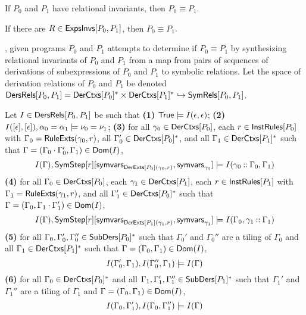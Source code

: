 \begin{ex}
  \label{ex:rel-invs}
\end{ex}

If $P_0$ and $P_1$ have relational invariants, then $P_0 \equiv P_1$.
%
\begin{lemma}
  \label{lemma:equiv-evidence}
  If there are $R \in \mathsf{ExpsInvs}[ P_0, P_1 ]$, then $P_0 \equiv P_1$.
\end{lemma}

\sys, given programs $P_0$ and $P_1$ attempts to determine if $P_0
\equiv P_1$ by synthesizing relational invariants of $P_0$ and $P_1$
from a map from pairs of sequences of derivations of subexpressions of
$P_0$ and $P_1$ to symbolic relations.
%
Let the space of derivation relations of $P_0$ and $P_1$ be denoted
$\mathsf{DersRels}[  P_0 ,  P_1  ] = \mathsf{DerCtxs}[ P_0 ]^{*} \times
\mathsf{DerCtxs}[ P_1 ]^{*} \hookrightarrow \mathsf{SymRels}[ P_0, P_1 ]$.
%
\begin{defn}
  \label{defn:der-invs}
  Let $I \in \mathsf{DersRels}[  P_0 ,  P_1  ] $ be such that
  \textbf{(1)} $\mathsf{True} \models I(\epsilon, \epsilon)$;
  \textbf{(2)} $I([ \epsilon ], [ \epsilon ]), \alpha_0 = \alpha_1
  \models \nu_0 = \nu_1$;
  \textbf{(3)} for all $\gamma_0 \in \mathsf{DerCtxs}[  P_0  ]$, %
  each $r \in \mathsf{InstRules}[  P_0  ]$ with $\Gamma_0 = \mathsf{RuleExts}( \gamma_0,
  r) $, %
  all $\Gamma_0' \in \mathsf{DerCtxs}[  P_0  ]^{*}$, and %
  all $\Gamma_1 \in \mathsf{DerCtxs}[ P_1 ]^{*}$ such that $\Gamma = (\Gamma_0
  \cdot \Gamma_0', \Gamma_1) \in \mathsf{Dom}(I)$,
  \[ I(\Gamma), %
  \subs{ \symstep{ r } }{ %
    \symvars{ \derexts{ P_0 }(\gamma_0, r) }, \symvars{ \gamma_0 } }  %
  \entails I( \gamma_0 \cons \Gamma_0, \Gamma_1) \]
  \textbf{(4)} for all $\Gamma_0 \in \mathsf{DerCtxs}[  P_0  ]$, %
  each $\gamma_1 \in \mathsf{DerCtxs}[  P_1  ]$, %
  each $r \in \mathsf{InstRules}[  P_1  ]$ with $\Gamma_1 = \mathsf{RuleExts}( \gamma_1,
  r)$, and %
  all $\Gamma_1' \in \mathsf{DerCtxs}[  P_0  ]^{*}$ such that $\Gamma =
  (\Gamma_0, \Gamma_1 \cdot \Gamma_1') \in \mathsf{Dom}(I)$,
  \[ I(\Gamma), %
  \subs{ \symstep{ r } }{ %
    \symvars{ \derexts{ P_1 }(\gamma_1, r) }, \symvars{ \gamma_1 } } %
  \entails I( \Gamma_0, \gamma_1 \cons \Gamma_1) \]
  \textbf{(5)} for all $\Gamma_0, \Gamma_0', \Gamma_0'' \in
  \mathsf{SubDers}[ P_0 ]^{*}$ such that $\Gamma_0'$ and $\Gamma_0''$ are a
  tiling of $\Gamma_0$ and all $\Gamma_1 \in \mathsf{DerCtxs}[ P_1 ]^{*}$ such
  that $\Gamma = (\Gamma_0, \Gamma_1) \in \mathsf{Dom}(I)$,
  \[ I(\Gamma_0', \Gamma_1), I(\Gamma_0'', \Gamma_1) \entails %
  I(\Gamma) \]
  \textbf{(6)} for all $\Gamma_0 \in \mathsf{DerCtxs}[ P_0 ]^{*}$ and %
  all $\Gamma_1, \Gamma_1', \Gamma_1'' \in \mathsf{SubDers}[ P_1 ]^{*}$ such
  that $\Gamma_1'$ and $\Gamma_1''$ are a tiling of $\Gamma_1$ and
  $\Gamma = (\Gamma_0, \Gamma_1) \in \mathsf{Dom}(I)$,
  \[ I(\Gamma_0, \Gamma_1'), I(\Gamma_0, \Gamma_1'') \entails %
  I(\Gamma) \]
\end{defn}
